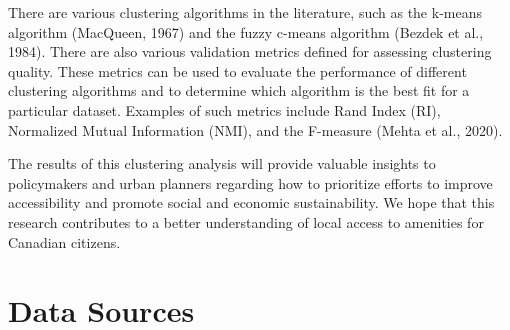 \documentclass[11pt, a4paper]{article}
\begin{document}
There are various clustering algorithms in the literature, such as the k-means algorithm (MacQueen, 1967) and the fuzzy c-means algorithm (Bezdek et al., 1984). There are also various validation metrics defined for assessing clustering quality. These metrics can be used to evaluate the performance of different clustering algorithms and to determine which algorithm is the best fit for a particular dataset. Examples of such metrics include Rand Index (RI), Normalized Mutual Information (NMI), and the F-measure (Mehta et al., 2020).
\par
The results of this clustering analysis will provide valuable insights to policymakers and urban planners regarding how to prioritize efforts to improve accessibility and promote social and economic sustainability. We hope that this research contributes to a better understanding of local access to amenities for Canadian citizens.




\section*{Data Sources}
\end{document}
